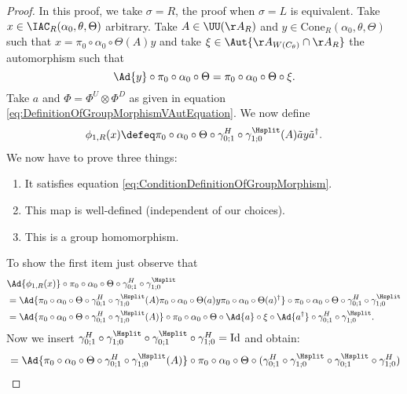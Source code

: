 \begin{proof}
	In this proof, we take $\sigma=R$, the proof when $\sigma=L$ is equivalent. Take $x\in \IAC_R(\alpha_0,\theta,\Theta)$ arbitrary. Take $A\in\UU(\AA_R)$ and $y\in\textrm{Cone}_R(\alpha_0,\theta,\Theta)$ such that $x=\pi_0\circ\alpha_0\circ\Theta(A)y$ and take $\xi\in\Aut{\AA_{W(C_\theta)}\cap \AA_R}$ the automorphism such that
	\begin{equation}
		\Ad{y}\circ\pi_0\circ\alpha_0\circ\Theta=\pi_0\circ\alpha_0\circ\Theta\circ\xi.
	\end{equation}
	Take $a$ and $\Phi=\Phi^U\otimes\Phi^D$ as given in equation \eqref{eq:DefinitionOfGroupMorphismVAutEquation}. We now define
	\begin{equation}
		\phi_{1,R}(x)\defeq \pi_0\circ\alpha_0\circ\Theta\circ\gamma^H_{0;1}\circ\gamma^{\Hsplit}_{1;0}(A)\tilde{a}y\tilde{a}^\dagger.
	\end{equation}
	We now have to prove three things:
	\begin{enumerate}
		\item It satisfies equation \eqref{eq:ConditionDefinitionOfGroupMorphism}.
		\item This map is well-defined (independent of our choices).
		\item This is a group homomorphism.
	\end{enumerate}
	To show the first item just observe that
	\begin{align}
		\nonumber
		&\Ad{\phi_{1,R}(x)}\circ\pi_0\circ\alpha_0\circ\Theta\circ\gamma^H_{0;1}\circ\gamma^{\Hsplit}_{1;0}\\
		&=\Ad{\pi_0\circ\alpha_0\circ\Theta\circ\gamma^H_{0;1}\circ\gamma^{\Hsplit}_{1;0}(A)\pi_0\circ\alpha_0\circ\Theta(a)y\pi_0\circ\alpha_0\circ\Theta(a)^\dagger}\circ\pi_0\circ\alpha_0\circ\Theta\circ\gamma^H_{0;1}\circ\gamma^{\Hsplit}_{1;0}\\
		\nonumber
		&=\Ad{\pi_0\circ\alpha_0\circ\Theta\circ\gamma^H_{0;1}\circ\gamma^{\Hsplit}_{1;0}(A)}\circ\pi_0\circ\alpha_0\circ\Theta\circ\Ad{a}\circ\xi\circ\Ad{a^\dagger}\circ\gamma^H_{0;1}\circ\gamma^{\Hsplit}_{1;0}.
	\end{align}
	Now we insert $\gamma^H_{0;1}\circ\gamma^{\Hsplit}_{1;0}\circ\gamma^{\Hsplit}_{0;1}\circ\gamma^H_{1;0}=\text{Id}$ and obtain:
	\begin{align}
		&=\Ad{\pi_0\circ\alpha_0\circ\Theta\circ\gamma^H_{0;1}\circ\gamma^{\Hsplit}_{1;0}(A)}\circ\pi_0\circ\alpha_0\circ\Theta\circ(\gamma^H_{0;1}\circ\gamma^{\Hsplit}_{1;0}\circ\gamma^{\Hsplit}_{0;1}\circ\gamma^H_{1;0})\\

\end{align}
\end{proof}
